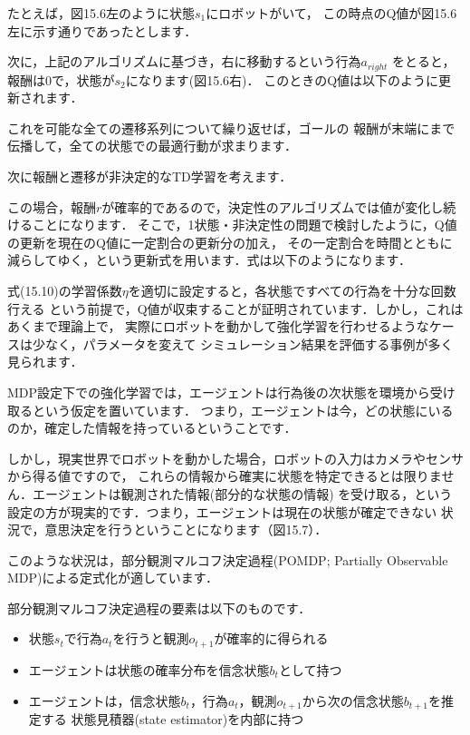たとえば，図15.6左のように状態$s_1$にロボットがいて，
この時点のQ値が図15.6左に示す通りであったとします．

次に，上記のアルゴリズムに基づき，右に移動するという行為$a_{right}$
をとると，報酬は0で，状態が$s_2$になります(図15.6右)．
このときのQ値は以下のように更新されます．

 

これを可能な全ての遷移系列について繰り返せば，ゴールの
報酬が末端にまで伝播して，全ての状態での最適行動が求まります．


次に報酬と遷移が非決定的なTD学習を考えます．

この場合，報酬$r$が確率的であるので，決定性のアルゴリズムでは値が変化し続けることになります．
そこで，1状態・非決定性の問題で検討したように，Q値の更新を現在のQ値に一定割合の更新分の加え，
その一定割合を時間とともに減らしてゆく，という更新式を用います．式は以下のようになります．

式(15.10)の学習係数$\eta$を適切に設定すると，各状態ですべての行為を十分な回数行える
という前提で，Q値が収束することが証明されています．しかし，これはあくまで理論上で，
実際にロボットを動かして強化学習を行わせるようなケースは少なく，パラメータを変えて
シミュレーション結果を評価する事例が多く見られます．


MDP設定下での強化学習では，エージェントは行為後の次状態を環境から受け取るという仮定を置いています．
つまり，エージェントは今，どの状態にいるのか，確定した情報を持っているということです．

しかし，現実世界でロボットを動かした場合，ロボットの入力はカメラやセンサから得る値ですので，
これらの情報から確実に状態を特定できるとは限りません．エージェントは観測された情報(部分的な状態の情報)
を受け取る，という設定の方が現実的です．つまり，エージェントは現在の状態が確定できない
状況で，意思決定を行うということになります（図15.7）．

このような状況は，部分観測マルコフ決定過程(POMDP; Partially Observable MDP)による定式化が適しています．

部分観測マルコフ決定過程の要素は以下のものです．

\begin{itemize}
\item 状態$s_t$で行為$a_t$を行うと観測$o_{t+1}$が確率的に得られる
\item エージェントは状態の確率分布を信念状態$b_t$として持つ
\item エージェントは，信念状態$b_t$，行為$a_t$，観測$o_{t+1}$から次の信念状態$b_{t+1}$を推定する
状態見積器(state estimator)を内部に持つ
\end{itemize}


